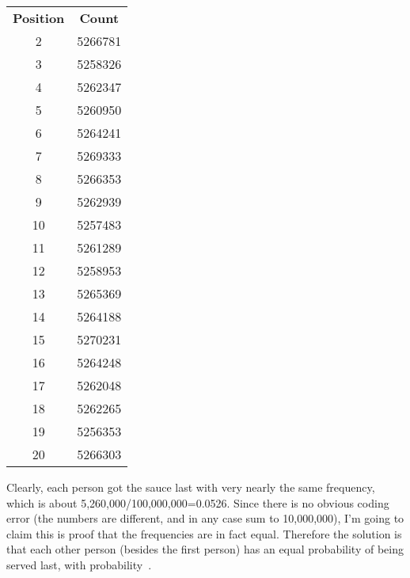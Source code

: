 \documentclass{article}
\begin{document}
\vspace{0.1in}
\begin{center}
\begin{tabular}{cc}
\textbf{Position} & \textbf{Count} \\
2  & 5266781 \\
3  & 5258326 \\
4  & 5262347 \\
5  & 5260950 \\
6  & 5264241 \\
7  & 5269333 \\
8  & 5266353 \\
9  & 5262939 \\
10 & 5257483 \\
11 & 5261289 \\
12 & 5258953 \\
13 & 5265369 \\
14 & 5264188 \\
15 & 5270231 \\
16 & 5264248 \\
17 & 5262048 \\
18 & 5262265 \\
19 & 5256353 \\
20 & 5266303 \\
\end{tabular}
\end{center}
\vspace{0.1in}

Clearly, each person got the sauce last with very nearly the same frequency, which is about 5,260,000/100,000,000=0.0526.
Since there is no obvious coding error (the numbers are different, and in any case sum to 10,000,000), I'm going to claim this is proof that the frequencies are in fact equal.
Therefore the solution is that each other person (besides the first person) has an equal probability of being served last, with probability
\,.
\end{document}
